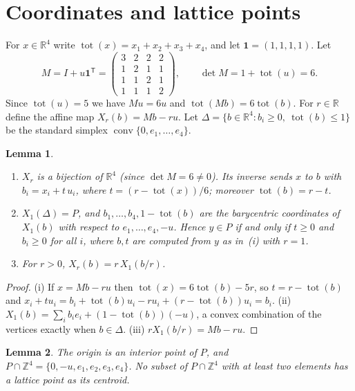 \documentclass[11pt]{article}
\newtheorem{lemma}{Lemma}
\theoremstyle{definition}
\theoremstyle{remark}
\newcommand{\R}{\mathbb R}
\newcommand{\Z}{\mathbb Z}
\newcommand{\one}{\mathbf 1}
\newcommand{\conv}{\operatorname{conv}}
\newcommand{\tot}{\operatorname{tot}}
\begin{document}
\section{Coordinates and lattice points}\label{sec:coord}

For $x\in\R^4$ write $\tot(x)=x_1+x_2+x_3+x_4$, and let $\one=(1,1,1,1)$. Let
\[
M=I+u\one^{\mathsf T}=\begin{pmatrix}3&2&2&2\\1&2&1&1\\1&1&2&1\\1&1&1&2\end{pmatrix},
\qquad \det M=1+\tot(u)=6 .
\]
Since $\tot(u)=5$ we have $Mu=6u$ and $\tot(Mb)=6\tot(b)$. For $r\in\R$ define the
affine map $X_r(b)=Mb-ru$. Let $\Delta=\{b\in\R^4: b_i\ge0,\ \tot(b)\le1\}$ be the
standard simplex $\conv\{0,e_1,\dots,e_4\}$.

\begin{lemma}\label{lem:coord}
\begin{enumerate}
\item[\textup{(i)}] $X_r$ is a bijection of $\R^4$ (since $\det M=6\ne0$). Its inverse sends $x$ to
$b$ with $b_i=x_i+t\,u_i$, where $t=(r-\tot(x))/6$; moreover $\tot(b)=r-t$.
\item[\textup{(ii)}] $X_1(\Delta)=P$, and $b_1,\dots,b_4,1-\tot(b)$ are the
barycentric coordinates of $X_1(b)$ with respect to $e_1,\dots,e_4,-u$. Hence
$y\in P$ if and only if $t\ge0$ and $b_i\ge0$ for all $i$, where $b,t$ are
computed from $y$ as in~\textup{(i)} with $r=1$.
\item[\textup{(iii)}] For $r>0$, $X_r(b)=r\,X_1(b/r)$.
\end{enumerate}
\end{lemma}

\begin{proof}
(i) If $x=Mb-ru$ then $\tot(x)=6\tot(b)-5r$, so $t=r-\tot(b)$ and
$x_i+tu_i=b_i+\tot(b)u_i-ru_i+(r-\tot(b))u_i=b_i$. (ii)
$X_1(b)=\sum_ib_ie_i+(1-\tot(b))(-u)$, a convex combination of the vertices
exactly when $b\in\Delta$. (iii) $rX_1(b/r)=Mb-ru$.
\end{proof}

\begin{lemma}\label{lem:points}
The origin is an interior point of $P$, and
$P\cap\Z^4=\{0,-u,e_1,e_2,e_3,e_4\}$. No subset of $P\cap\Z^4$ with at least
two elements has a lattice point as its centroid.
\end{lemma}
\end{document}

